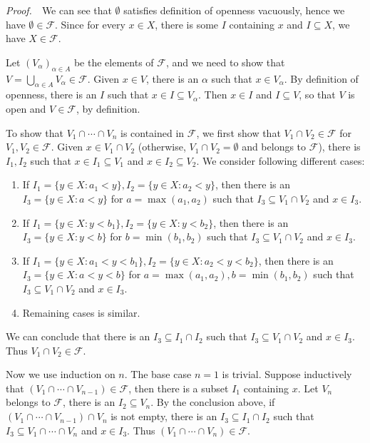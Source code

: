 \documentclass{book}
\newcommand{\pff}{\vspace{.25em}\noindent\emph{Proof.}~~}
\begin{document}
\pff We can see that $\emptyset$ satisfies definition of openness vacuously, hence we have $\emptyset\in\mathcal{F}$. Since for every $x\in X$, there is some $I$ containing $x$ and $I\subseteq X$, we have $X\in\mathcal{F}$.

Let $(V_\alpha)_{\alpha\in A}$ be the elements of $\mathcal{F}$, and we need to show that $V=\bigcup_{\alpha\in A}V_\alpha\in\mathcal{F}$. Given $x\in V$, there is an $\alpha$ such that $x\in V_\alpha$. By definition of openness, there is an $I$ such that $x\in I\subseteq V_\alpha$. Then $x\in I$ and $I\subseteq V$, so that $V$ is open and $V\in\mathcal{F}$, by definition.

To show that $V_1\cap\cdots\cap V_n$ is contained in $\mathcal{F}$, we first show that $V_1\cap V_2\in\mathcal{F}$ for $V_1,V_2\in\mathcal{F}$. Given $x\in V_1\cap V_2$ (otherwise, $V_1\cap V_2=\emptyset$ and belongs to $\mathcal{F}$), there is $I_1,I_2$ such that $x\in I_1\subseteq V_1$ and $x\in I_2\subseteq V_2$. We consider following different cases:
\begin{enumerate}[label=(\arabic*)]
    \item If $I_1=\{y\in X:a_1<y\},I_2=\{y\in X:a_2<y\}$, then there is an $I_3=\{y\in X:a<y\}$ for $a=\max(a_1,a_2)$ such that $I_3\subseteq V_1\cap V_2$ and $x\in I_3$.
    \item If $I_1=\{y\in X:y<b_1\},I_2=\{y\in X:y<b_2\}$, then there is an $I_3=\{y\in X:y<b\}$ for $b=\min(b_1,b_2)$ such that $I_3\subseteq V_1\cap V_2$ and $x\in I_3$.
    \item If $I_1=\{y\in X:a_1<y<b_1\},I_2=\{y\in X:a_2<y<b_2\}$, then there is an $I_3=\{y\in X:a<y<b\}$ for $a=\max(a_1,a_2),b=\min(b_1,b_2)$ such that $I_3\subseteq V_1\cap V_2$ and $x\in I_3$.
    \item Remaining cases is similar.
\end{enumerate}
We can conclude that there is an $I_3\subseteq I_1\cap I_2$ such that $I_3\subseteq V_1\cap V_2$ and $x\in I_3$. Thus $V_1\cap V_2\in\mathcal{F}$.

Now we use induction on $n$. The base case $n=1$ is trivial. Suppose inductively that $(V_1\cap\cdots\cap V_{n-1})\in\mathcal{F}$, then there is a subset $I_1$ containing $x$. Let $V_n$ belongs to $\mathcal{F}$, there is an $I_2\subseteq V_n$. By the conclusion above, if $(V_1\cap\cdots\cap V_{n-1})\cap V_n$ is not empty, there is an $I_3\subseteq I_1\cap I_2$ such that $I_3\subseteq V_1\cap\cdots\cap V_n$ and $x\in I_3$. Thus $(V_1\cap\cdots\cap V_n)\in\mathcal{F}$.
\end{document}
